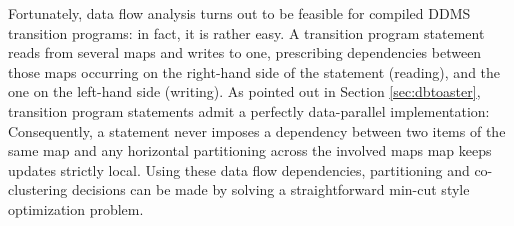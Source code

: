 Fortunately, data flow analysis turns out to be
feasible for compiled DDMS transition programs: in fact, it is rather easy.
A transition program statement reads from several maps and writes to one,
prescribing dependencies between those maps occurring on the right-hand side of the statement (reading), and the one on the left-hand side (writing).
As pointed out in Section \ref{sec:dbtoaster}, transition program statements
admit a perfectly data-parallel implementation: Consequently,
a statement never imposes a dependency between two items of the same map
and any horizontal partitioning across the involved maps
map keeps updates strictly local.
%
Using these data flow dependencies, partitioning and co-clustering
decisions can be made by
solving a straightforward min-cut style optimization problem.



